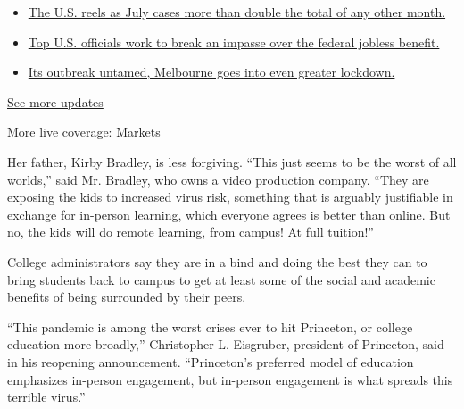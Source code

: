 \begin{itemize}
\tightlist
\item
  \href{https://www.nytimes.com/2020/08/01/world/coronavirus-covid-19.html?action=click\&pgtype=Article\&state=default\&region=MAIN_CONTENT_1\&context=storylines_live_updates\#link-34047410}{The
  U.S. reels as July cases more than double the total of any other
  month.}
\item
  \href{https://www.nytimes.com/2020/08/01/world/coronavirus-covid-19.html?action=click\&pgtype=Article\&state=default\&region=MAIN_CONTENT_1\&context=storylines_live_updates\#link-780ec966}{Top
  U.S. officials work to break an impasse over the federal jobless
  benefit.}
\item
  \href{https://www.nytimes.com/2020/08/01/world/coronavirus-covid-19.html?action=click\&pgtype=Article\&state=default\&region=MAIN_CONTENT_1\&context=storylines_live_updates\#link-2bc8948}{Its
  outbreak untamed, Melbourne goes into even greater lockdown.}
\end{itemize}

\href{https://www.nytimes.com/2020/08/01/world/coronavirus-covid-19.html?action=click\&pgtype=Article\&state=default\&region=MAIN_CONTENT_1\&context=storylines_live_updates}{See
more updates}

More live coverage:
\href{https://www.nytimes.com/live/2020/07/31/business/stock-market-today-coronavirus?action=click\&pgtype=Article\&state=default\&region=MAIN_CONTENT_1\&context=storylines_live_updates}{Markets}

Her father, Kirby Bradley, is less forgiving. ``This just seems to be
the worst of all worlds,'' said Mr. Bradley, who owns a video production
company. ``They are exposing the kids to increased virus risk, something
that is arguably justifiable in exchange for in-person learning, which
everyone agrees is better than online. But no, the kids will do remote
learning, from campus! At full tuition!''

College administrators say they are in a bind and doing the best they
can to bring students back to campus to get at least some of the social
and academic benefits of being surrounded by their peers.

``This pandemic is among the worst crises ever to hit Princeton, or
college education more broadly,'' Christopher L. Eisgruber, president of
Princeton, said in his reopening announcement. ``Princeton's preferred
model of education emphasizes in-person engagement, but in-person
engagement is what spreads this terrible virus.''

